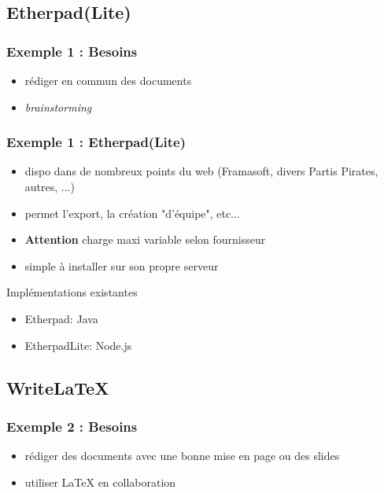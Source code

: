 \documentclass{beamer}
\begin{document}
\subsection{Etherpad(Lite)} %

\begin{frame}
    \frametitle{Exemple 1 : Besoins}

    \begin{itemize}
        \item rédiger en commun des documents
        \item \textit{brainstorming}
    \end{itemize}

\end{frame}


\begin{frame}
    \frametitle{Exemple 1 : Etherpad(Lite)}

    \begin{itemize}
        \item dispo dans de nombreux points du web (Framasoft, divers Partis Pirates, autres, ...)
        \item permet l'export, la création "d'équipe", etc...
        \item \textbf{Attention} charge maxi variable selon fournisseur
        \item simple à installer sur son propre serveur
    \end{itemize}

    \begin{block}{Implémentations existantes}
        \begin{itemize}
            \item Etherpad: Java
            \item EtherpadLite: Node.js
        \end{itemize}
    \end{block}


\end{frame}

\subsection{Write\LaTeX} %

\begin{frame}
    \frametitle{Exemple 2 : Besoins}

    \begin{itemize}
        \item rédiger des documents avec une bonne mise en page ou des slides
        \item utiliser \LaTeX{} en collaboration
    \end{itemize}

\end{frame}
\end{document}
